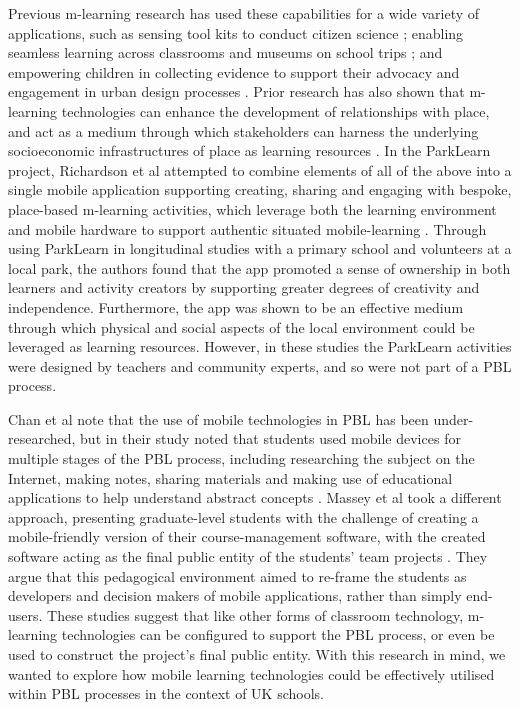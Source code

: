 \documentclass[,hyphens]{sigchi}
\begin{document}
Previous m-learning research has used these capabilities for a wide variety of applications, such as sensing tool kits to conduct citizen science \cite{Sharples2017}; enabling seamless learning across classrooms and museums on school trips \cite{Vavoula2009}; and empowering children in collecting evidence to support their advocacy and engagement in urban design processes \cite{Peacock2018}. Prior research has also shown that m-learning technologies can enhance the development of relationships with place, and act as a medium through which stakeholders can harness the underlying socioeconomic infrastructures of place as learning resources \cite{Richardson2017}. In the ParkLearn project, Richardson et al attempted to combine elements of all of the above into a single mobile application supporting creating, sharing and engaging with bespoke, place-based m-learning activities, which leverage both the learning environment and mobile hardware to support authentic situated mobile-learning \cite{Richardson2018}. Through using ParkLearn in longitudinal studies with a primary school and volunteers at a local park, the authors found that the app promoted a sense of ownership in both learners and activity creators by supporting greater degrees of creativity and independence. Furthermore, the app was shown to be an effective medium through which physical and social aspects of the local environment could be leveraged as learning resources. However, in these studies the ParkLearn activities were designed by teachers and community experts, and so were not part of a PBL process.

Chan et al note that the use of mobile technologies in PBL has been under-researched, but in their study noted that students used mobile devices for multiple stages of the PBL process, including researching the subject on the Internet, making notes, sharing materials and making use of educational applications to help understand abstract concepts \cite{Chan2015}. Massey et al took a different approach, presenting graduate-level students with the challenge of creating a mobile-friendly version of their course-management software, with the created software acting as the final public entity of the students' team projects \cite{Massey2006}. They argue that this pedagogical environment aimed to re-frame the students as developers and decision makers of mobile applications, rather than simply end-users. These studies suggest that like other forms of classroom technology, m-learning technologies can be configured to support the PBL process, or even be used to construct the project's final public entity. With this research in mind, we wanted to explore how mobile learning technologies could be effectively utilised within PBL processes in the context of UK schools.
\end{document}
